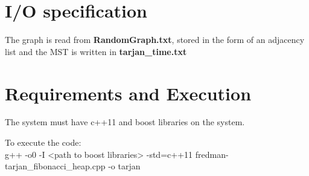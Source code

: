 \documentclass[]{article}
\begin{document}
\section{I/O specification}

	The graph is read from \textbf{RandomGraph.txt}, stored in the form of an adjacency list and the MST is written in \textbf{tarjan\_time.txt} 

\section{Requirements and Execution}

The system must have c++11 and boost libraries on the system.

To execute the code:\\ 
g++ -o0 -I <path to boost libraries> -std=c++11 fredman-tarjan\_fibonacci\_heap.cpp -o tarjan
\end{document}
